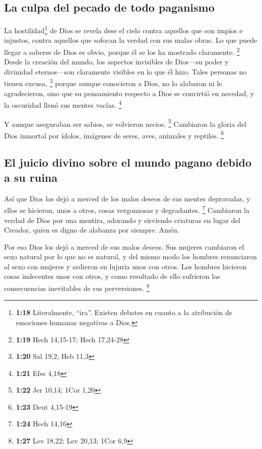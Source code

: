 \hypertarget{la-culpa-del-pecado-de-todo-paganismo}{%
\subsection{La culpa del pecado de todo
paganismo}\label{la-culpa-del-pecado-de-todo-paganismo}}

 La hostilidad\footnote{\textbf{1:18} Literalmente,
  ``ira''. Existen debates en cuanto a la atribución de emociones
  humanas negativas a Dios.} de Dios se revela dese el cielo contra
aquellos que son impíos e injustos, contra aquellos que sofocan la
verdad con sus malas obras.  Lo que puede llegar a
saberse de Dios es obvio, porque él se los ha mostrado claramente.
\footnote{\textbf{1:19} Hech 14,15-17; Hech 17,24-28} 
Desde la creación del mundo, los aspectos invisibles de Dios---su poder
y divinidad eternos---son claramente visibles en lo que él hizo. Tales
personas no tienen excusa, \footnote{\textbf{1:20} Sal 19,2; Heb 11,3}
 porque aunque conocieron a Dios, no lo alabaron ni le
agradecieron, sino que su pensamiento respecto a Dios se convirtió en
necedad, y la oscuridad llenó sus mentes vacías. \footnote{\textbf{1:21}
  Efes 4,18}

 Y aunque aseguraban ser sabios, se volvieron necios.
\footnote{\textbf{1:22} Jer 10,14; 1Cor 1,20}  Cambiaron
la gloria del Dios inmortal por ídolos, imágenes de seres, aves,
animales y reptiles. \footnote{\textbf{1:23} Deut 4,15-19}

\hypertarget{el-juicio-divino-sobre-el-mundo-pagano-debido-a-su-ruina}{%
\subsection{El juicio divino sobre el mundo pagano debido a su
ruina}\label{el-juicio-divino-sobre-el-mundo-pagano-debido-a-su-ruina}}

 Así que Dios los dejó a merced de los malos deseos de
sus mentes depravadas, y ellos se hicieron, unos a otros, cosas
vergonzosas y degradantes. \footnote{\textbf{1:24} Hech 14,16}
 Cambiaron la verdad de Dios por una mentira, adorando y
sirviendo criaturas en lugar del Creador, quien es digno de alabanza por
siempre. Amén.

 Por eso Dios los dejó a merced de sus malos deseos. Sus
mujeres cambiaron el sexo natural por lo que no es natural,
 y del mismo modo los hombres renunciaron al sexo con
mujeres y ardieron en lujuria unos con otros. Los hombres hicieron cosas
indecentes unos con otros, y como resultado de ello sufrieron las
consecuencias inevitables de sus perversiones. \footnote{\textbf{1:27}
  Lev 18,22; Lev 20,13; 1Cor 6,9}

